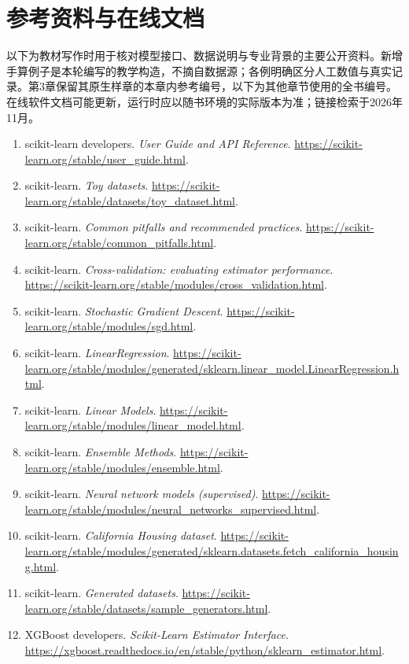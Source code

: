 \chapter*{参考资料与在线文档}
以下为教材写作时用于核对模型接口、数据说明与专业背景的主要公开资料。新增手算例子是本轮编写的教学构造，不摘自数据源；各例明确区分人工数值与真实记录。第3章保留其原生样章的本章内参考编号，以下为其他章节使用的全书编号。在线软件文档可能更新，运行时应以随书环境的实际版本为准；链接检索于2026年11月。
\begingroup\small\sloppy\setlength{\emergencystretch}{5em}\begin{enumerate}[leftmargin=2em]
\item scikit-learn developers. \emph{User Guide and API Reference}. \url{https://scikit-learn.org/stable/user_guide.html}.
\item scikit-learn. \emph{Toy datasets}. \url{https://scikit-learn.org/stable/datasets/toy_dataset.html}.
\item scikit-learn. \emph{Common pitfalls and recommended practices}. \url{https://scikit-learn.org/stable/common_pitfalls.html}.
\item scikit-learn. \emph{Cross-validation: evaluating estimator performance}. \url{https://scikit-learn.org/stable/modules/cross_validation.html}.
\item scikit-learn. \emph{Stochastic Gradient Descent}. \url{https://scikit-learn.org/stable/modules/sgd.html}.
\item scikit-learn. \emph{LinearRegression}. \url{https://scikit-learn.org/stable/modules/generated/sklearn.linear_model.LinearRegression.html}.
\item scikit-learn. \emph{Linear Models}. \url{https://scikit-learn.org/stable/modules/linear_model.html}.
\item scikit-learn. \emph{Ensemble Methods}. \url{https://scikit-learn.org/stable/modules/ensemble.html}.
\item scikit-learn. \emph{Neural network models (supervised)}. \url{https://scikit-learn.org/stable/modules/neural_networks_supervised.html}.
\item scikit-learn. \emph{California Housing dataset}. \url{https://scikit-learn.org/stable/modules/generated/sklearn.datasets.fetch_california_housing.html}.
\item scikit-learn. \emph{Generated datasets}. \url{https://scikit-learn.org/stable/datasets/sample_generators.html}.
\item XGBoost developers. \emph{Scikit-Learn Estimator Interface}. \url{https://xgboost.readthedocs.io/en/stable/python/sklearn_estimator.html}.

\end{enumerate}
